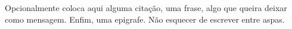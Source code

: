 Opcionalmente coloca aqui alguma citação, uma frase, algo que queira deixar como mensagem. Enfim, uma epigrafe. Não esquecer de escrever entre aspas.


